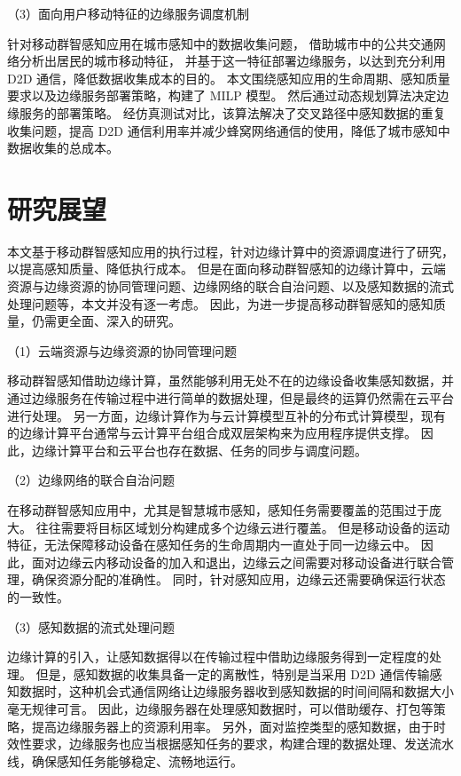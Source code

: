 （3）面向用户移动特征的边缘服务调度机制

针对移动群智感知应用在城市感知中的数据收集问题，
借助城市中的公共交通网络分析出居民的城市移动特征，
并基于这一特征部署边缘服务，以达到充分利用 D2D 通信，降低数据收集成本的目的。
本文围绕感知应用的生命周期、感知质量要求以及边缘服务部署策略，构建了 MILP 模型。
然后通过动态规划算法决定边缘服务的部署策略。
经仿真测试对比，该算法解决了交叉路径中感知数据的重复收集问题，提高 D2D 通信利用率并减少蜂窝网络通信的使用，降低了城市感知中数据收集的总成本。

\section{研究展望}

本文基于移动群智感知应用的执行过程，针对边缘计算中的资源调度进行了研究，以提高感知质量、降低执行成本。
但是在面向移动群智感知的边缘计算中，云端资源与边缘资源的协同管理问题、边缘网络的联合自治问题、以及感知数据的流式处理问题等，本文并没有逐一考虑。
因此，为进一步提高移动群智感知的感知质量，仍需更全面、深入的研究。

（1）云端资源与边缘资源的协同管理问题

移动群智感知借助边缘计算，虽然能够利用无处不在的边缘设备收集感知数据，并通过边缘服务在传输过程中进行简单的数据处理，但是最终的运算仍然需在云平台进行处理。
另一方面，边缘计算作为与云计算模型互补的分布式计算模型，现有的边缘计算平台通常与云计算平台组合成双层架构来为应用程序提供支撑。
因此，边缘计算平台和云平台也存在数据、任务的同步与调度问题。

（2）边缘网络的联合自治问题

在移动群智感知应用中，尤其是智慧城市感知，感知任务需要覆盖的范围过于庞大。
往往需要将目标区域划分构建成多个边缘云进行覆盖。
但是移动设备的运动特征，无法保障移动设备在感知任务的生命周期内一直处于同一边缘云中。
因此，面对边缘云内移动设备的加入和退出，边缘云之间需要对移动设备进行联合管理，确保资源分配的准确性。
同时，针对感知应用，边缘云还需要确保运行状态的一致性。

（3）感知数据的流式处理问题

边缘计算的引入，让感知数据得以在传输过程中借助边缘服务得到一定程度的处理。
但是，感知数据的收集具备一定的离散性，特别是当采用 D2D 通信传输感知数据时，这种机会式通信网络让边缘服务器收到感知数据的时间间隔和数据大小毫无规律可言。
因此，边缘服务器在处理感知数据时，可以借助缓存、打包等策略，提高边缘服务器上的资源利用率。
另外，面对监控类型的感知数据，由于时效性要求，边缘服务也应当根据感知任务的要求，构建合理的数据处理、发送流水线，确保感知任务能够稳定、流畅地运行。
